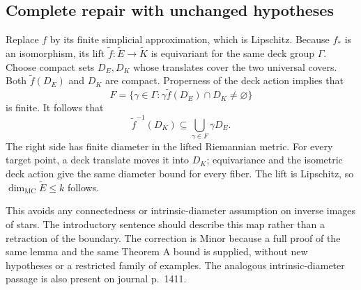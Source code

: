 \documentclass[10pt]{article}
\begin{document}
\subsection*{Complete repair with unchanged hypotheses}
Replace \(f\) by its finite simplicial approximation, which is Lipschitz. Because \(f_*\) is an isomorphism, its lift \(\widetilde f:\widetilde E\to\widetilde K\) is equivariant for the same deck group \(\Gamma\). Choose compact sets \(D_E,D_K\) whose translates cover the two universal covers. Both \(\widetilde f(D_E)\) and \(D_K\) are compact. Properness of the deck action implies that \[F=\{\gamma\in\Gamma:
       \gamma\widetilde f(D_E)\cap D_K\ne\varnothing\}\] is finite. It follows that \[\widetilde f^{-1}(D_K)\subseteq\bigcup_{\gamma\in F}\gamma D_E.\] The right side has finite diameter in the lifted Riemannian metric. For every target point, a deck translate moves it into \(D_K\); equivariance and the isometric deck action give the same diameter bound for every fiber. The lift is Lipschitz, so \(\dim_{\mathrm{MC}}\widetilde E\le k\) follows.\par
This avoids any connectedness or intrinsic-diameter assumption on inverse images of stars. The introductory sentence should describe this map rather than a retraction of the boundary. The correction is Minor because a full proof of the same lemma and the same Theorem A bound is supplied, without new hypotheses or a restricted family of examples. The analogous intrinsic-diameter passage is also present on journal p. 1411.\par
\end{document}
